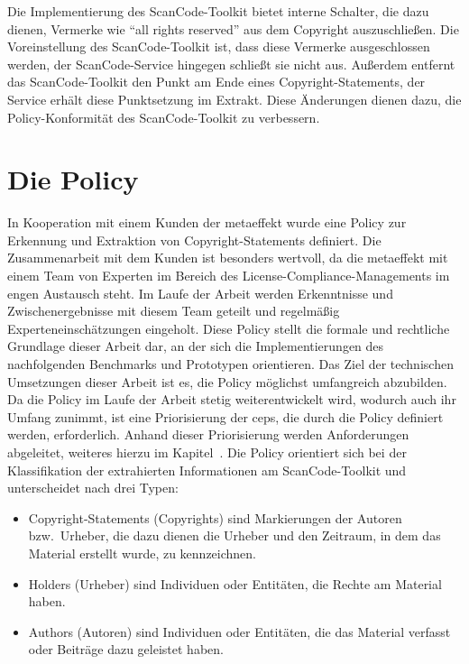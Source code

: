 Die Implementierung des ScanCode-Toolkit bietet interne Schalter, die dazu dienen, Vermerke wie \enquote{all rights reserved} aus dem Copyright auszuschließen.
Die Voreinstellung des ScanCode-Toolkit ist, dass diese Vermerke ausgeschlossen werden, der ScanCode-Service hingegen schließt sie nicht aus.
Außerdem entfernt das ScanCode-Toolkit den Punkt am Ende eines Copyright-Statements, der Service erhält diese Punktsetzung im Extrakt.
Diese Änderungen dienen dazu, die Policy-Konformität des ScanCode-Toolkit zu verbessern\autocite{noauthor_metaeffekt-scancode-service_2025}.


\section{Die Policy}\label{sec:policy}

In Kooperation mit einem Kunden der metaeffekt wurde eine Policy zur Erkennung und Extraktion von Copyright-Statements definiert.
Die Zusammenarbeit mit dem Kunden ist besonders wertvoll, da die metaeffekt mit einem Team von Experten im Bereich des License-Compliance-Managements im engen Austausch steht.
Im Laufe der Arbeit werden Erkenntnisse und Zwischenergebnisse mit diesem Team geteilt und regelmäßig Experteneinschätzungen eingeholt.
Diese Policy stellt die formale und rechtliche Grundlage dieser Arbeit dar, an der sich die Implementierungen des nachfolgenden Benchmarks und Prototypen orientieren.
Das Ziel der technischen Umsetzungen dieser Arbeit ist es, die Policy möglichst umfangreich abzubilden.
Da die Policy im Laufe der Arbeit stetig weiterentwickelt wird, wodurch auch ihr Umfang zunimmt, ist eine Priorisierung der \glspl{cep}, die durch die Policy definiert werden, erforderlich.
Anhand dieser Priorisierung werden Anforderungen abgeleitet, weiteres hierzu im Kapitel~.
Die Policy orientiert sich bei der Klassifikation der extrahierten Informationen am ScanCode-Toolkit und unterscheidet nach drei Typen:
\begin{itemize}
    \item Copyright-Statements (Copyrights) sind Markierungen der Autoren bzw.\ Urheber, die dazu dienen die Urheber und den Zeitraum, in dem das Material erstellt wurde, zu kennzeichnen.
    \item Holders (Urheber) sind Individuen oder Entitäten, die Rechte am Material haben.
    \item Authors (Autoren) sind Individuen oder Entitäten, die das Material verfasst oder Beiträge dazu geleistet haben.
\end{itemize}

